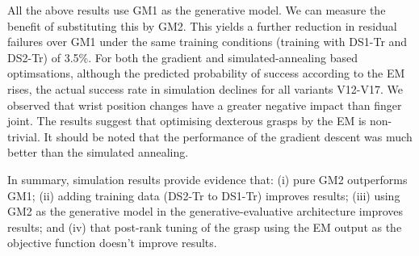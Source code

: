 All the above results use GM1 as the generative model. We can measure the benefit of substituting this by GM2. This yields a further reduction in residual failures over GM1 under the same training conditions (training with DS1-Tr and DS2-Tr) of 3.5\%. 
For both the gradient and simulated-annealing based optimsations, although the predicted probability of success according to the EM rises, the actual success rate in simulation declines for all variants V12-V17. We observed that wrist position changes have a greater negative impact than finger joint. The results suggest that optimising dexterous grasps by the EM is non-trivial. It should be noted that the performance of the gradient descent was much better than the simulated annealing. 

In summary, simulation results provide evidence that: (i) pure GM2 outperforms GM1; (ii) adding training data (DS2-Tr to DS1-Tr) improves results; (iii) using GM2 as the generative model in the generative-evaluative architecture improves results; and (iv) that post-rank tuning of the grasp using the EM output as the objective function doesn't improve results.



